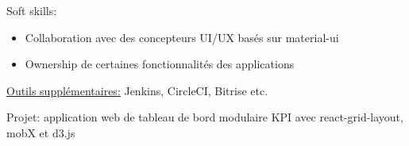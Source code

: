 \documentclass[10.5pt,a4paper,ragged2e,withhyper]{altacv}
\begin{document}
\medskip
Soft skills:
\begin{itemize}
  \item Collaboration avec des concepteurs UI/UX basés sur material-ui
  \item Ownership de certaines fonctionnalités des applications
\end{itemize}
\begin{itshape}
  \underline{Outils supplémentaires:}
  \small{Jenkins, CircleCI, Bitrise etc.}
\end{itshape}

\divider

Projet: application web de tableau de bord modulaire KPI avec react-grid-layout, mobX et d3.js

\newpage
{}
\end{document}
